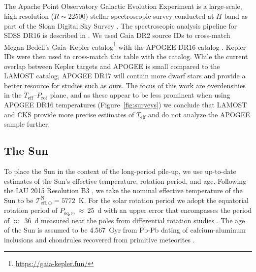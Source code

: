 \documentclass[trackchanges,twocolumn]{aastex631}
\newcommand{\teff}{\ensuremath{T_{\mathrm{eff}}}\xspace}
\newcommand{\prot}{\ensuremath{P_\mathrm{rot}}\xspace}
\begin{document}
\subsection{}
The Apache Point Observatory Galactic Evolution Experiment \citep[APOGEE;][]{Majewski2017} is a large-scale, high-resolution ($R \sim 22500$) stellar spectroscopic survey conducted at $H$-band as part of the Sloan Digital Sky Survey \citep[SDSS-IV;][]{Blanton2017}. The spectroscopic analysis pipeline for SDSS DR16 is described in \citet{Jonsson2020}. We used Gaia DR2 source IDs \citep{Gaia2016, Gaia2018} to cross-match Megan Bedell's Gaia--Kepler catalog\footnote{\url{https://gaia-kepler.fun/}} with the APOGEE DR16 catalog \citep{Ahumada2020}. Kepler IDs were then used to cross-match this table with the \citet{McQuillan2014} catalog. While the current overlap between Kepler targets and APOGEE is small compared to the LAMOST catalog, APOGEE DR17 will contain more dwarf stars and provide a better resource for studies such as ours. The focus of this work are overdensities in the \teff--\prot plane, and as these appear to be less prominent when using  APOGEE DR16 temperatures (Figure~\ref{fig:surveys}) we conclude that LAMOST and CKS provide more precise estimates of \teff and do not analyze the APOGEE sample further. 

\subsection{The Sun}
To place the Sun in the context of the long-period pile-up, we use up-to-date estimates of the Sun's effective temperature, rotation period, and age. Following the IAU 2015 Resolution B3 \citep{Prsa2016}, we take the nominal effective temperature of the Sun to be $\mathcal{T}^\mathrm{N}_\mathrm{eff,\odot} = 5772$~K. For the solar rotation period we adopt the equatorial rotation period of $P_\mathrm{eq,\odot}~\approx~25$~d with an upper error that encompasses the period of $\approx$~36~d measured near the poles from differential rotation studies \citep[][and references therein]{Thompson2003}.  The age of the Sun is assumed to be 4.567~Gyr from Pb-Pb dating of calcium-aluminum inclusions and chondrules recovered from primitive meteorites \citep[][and references therein]{Bahcall1995}.
\end{document}
